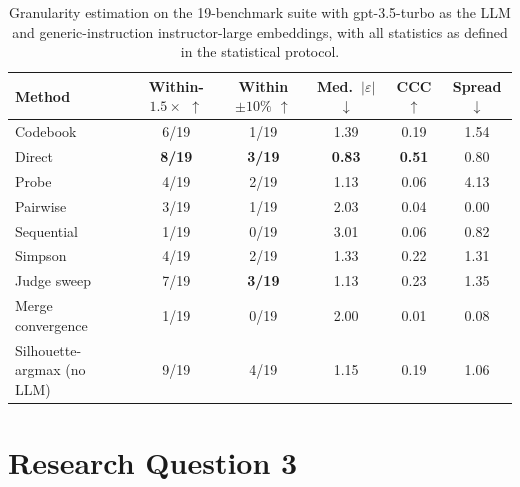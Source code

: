\documentclass[11pt,a4paper,oneside]{report}
\begin{document}
\begin{table}[htbp]
\centering
\small
\begin{tabular}{lccccc}
\toprule
Method & Within-$1.5\times$ $\uparrow$ & Within $\pm10\%$ $\uparrow$ & Med.\ $|\varepsilon|$ $\downarrow$ & CCC $\uparrow$ & Spread $\downarrow$ \\
\midrule
Codebook & 6/19 & 1/19 & 1.39 & 0.19 & 1.54 \\
Direct & \textbf{8/19} & \textbf{3/19} & \textbf{0.83} & \textbf{0.51} & 0.80 \\
Probe & 4/19 & 2/19 & 1.13 & 0.06 & 4.13 \\
Pairwise & 3/19 & 1/19 & 2.03 & 0.04 & 0.00 \\
Sequential & 1/19 & 0/19 & 3.01 & 0.06 & 0.82 \\
Simpson & 4/19 & 2/19 & 1.33 & 0.22 & 1.31 \\
Judge sweep & 7/19 & \textbf{3/19} & 1.13 & 0.23 & 1.35 \\
Merge convergence & 1/19 & 0/19 & 2.00 & 0.01 & 0.08 \\
\midrule
Silhouette-argmax (no LLM) & 9/19 & 4/19 & 1.15 & 0.19 & 1.06 \\
\bottomrule
\end{tabular}
\caption[Granularity estimation scoreboard, gpt-3.5-turbo]{Granularity estimation on the
19-benchmark suite with {\small\ttfamily gpt-3.5-turbo} as the LLM and
generic-instruction {\small\ttfamily instructor-large} embeddings, with all
statistics as defined in the statistical protocol.}
\label{tab:rq2-scoreboard-gpt35}
\end{table}

\FloatBarrier

\section{Research Question 3}\label{app:results-rq3}
\end{document}
